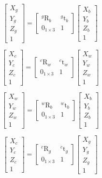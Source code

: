 \documentclass{article}
\begin{document}
\[ \begin{bmatrix} X_g\\ Y_g\\ Z_g\\ 1 \end{bmatrix} = \begin{bmatrix} _{}^{g}\textrm{R}_b & _{}^{g}\textrm{t}_b \\ 0_{1 \times 3} & 1 \end{bmatrix} \begin{bmatrix} X_b\\ Y_b\\ Z_b\\ 1 \end{bmatrix} \]
\pagebreak

\[ \begin{bmatrix} X_c\\ Y_c\\ Z_c\\ 1 \end{bmatrix} = \begin{bmatrix} _{}^{c}\textrm{R}_w & _{}^{c}\textrm{t}_w \\ 0_{1 \times 3} & 1 \end{bmatrix} \begin{bmatrix} X_w\\ Y_w\\ Z_w\\ 1 \end{bmatrix} \]
\pagebreak

\[ \begin{bmatrix} X_w\\ Y_w\\ Z_w\\ 1 \end{bmatrix} = \begin{bmatrix} _{}^{w}\textrm{R}_b & _{}^{w}\textrm{t}_b \\ 0_{1 \times 3} & 1 \end{bmatrix} \begin{bmatrix} X_b\\ Y_b\\ Z_b\\ 1 \end{bmatrix} \]
\pagebreak

\[ \begin{bmatrix} X_c\\ Y_c\\ Z_c\\ 1 \end{bmatrix} = \begin{bmatrix} _{}^{c}\textrm{R}_g & _{}^{c}\textrm{t}_g \\ 0_{1 \times 3} & 1 \end{bmatrix} \begin{bmatrix} X_g\\ Y_g\\ Z_g\\ 1 \end{bmatrix} \]
\pagebreak
\end{document}
